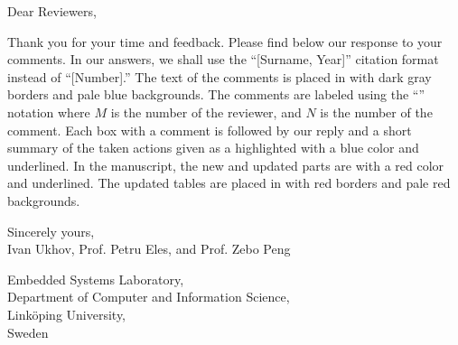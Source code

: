Dear Reviewers,

\vspace{3em}
\noindent Thank you for your time and feedback. Please find below our response
to your comments. In our answers, we shall use the ``[Surname, Year]'' citation
format instead of ``[Number].'' The text of the comments is placed in
 with dark gray borders and pale blue backgrounds. The
comments are labeled using the ``'' notation where $M$ is the
number of the reviewer, and $N$ is the number of the comment. Each box with a
comment is followed by our reply and a short summary of the taken actions given
as a  highlighted with a blue color and underlined. In the
manuscript, the new and updated parts are  with a red color and
underlined. The updated tables are placed in  with red borders
and pale red backgrounds.

\vspace{3em}
\noindent Sincerely yours,\\
Ivan Ukhov, Prof. Petru Eles, and Prof. Zebo Peng

\vspace{1em}
\noindent Embedded Systems Laboratory,\\
Department of Computer and Information Science,\\
Link\"{o}ping University,\\
Sweden

$ $
